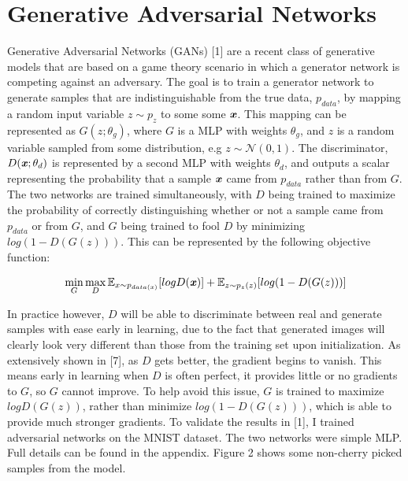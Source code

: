 \documentclass{article}
\begin{document}
\pagebreak

\section{Generative Adversarial Networks}
\noindent Generative Adversarial Networks (GANs) [1] are a recent class of generative models that are based on a game theory scenario in which a generator
network is competing against an adversary. The goal is to train a generator network to generate samples that are indistinguishable from the true data, $p_{data}$,
by mapping a random input variable $z \sim p_z$ to some some $\textbf{\textit{x}}$. This mapping can be represented as $G(z;\theta_g)$, where $G$ is a MLP with weights $\theta_g$, and $z$ is a random
variable sampled from some distribution, e.g $z \sim \mathcal{N}(0,1)$. The discriminator, $D(\textbf{\textit{x}}; \theta_d)$ is represented by a second MLP with weights
$\theta_d$, and outputs a scalar representing the probability that a sample $\textbf{\textit{x}}$ came from $p_{data}$ rather than from $G$. The two networks are trained
simultaneously, with $D$ being trained to maximize the probability of correctly distinguishing whether or not a sample came from $p_{data}$ or from $G$, and $G$ being 
trained to fool $D$ by minimizing $log(1-D(G(z)))$. This can be represented by the following objective function:

\[\min\limits_{G}\max\limits_{D} \mathbb{E}_{x \sim p_{data(x)}} [logD(\textbf{\textit{x}})] + \mathbb{E}_{z \sim p_z(z)}[log(1 - D(G(z)))]\]

\noindent In practice however, $D$ will be able to discriminate between real and generate samples with
ease early in learning, due to the fact that generated images will clearly look very different than those from the training set upon initialization. As extensively shown in [7],
as $D$ gets better, the gradient begins to vanish. This means early in learning when $D$ is often perfect, it provides little or no gradients to $G$, so $G$ cannot improve.
To help avoid this issue, $G$ is trained to maximize $logD(G(z))$, rather than minimize $log(1-D(G(z)))$, which is able to provide much stronger gradients. To validate the
results in [1], I trained adversarial networks on the MNIST dataset. The two networks were simple MLP. Full details can be found in the appendix. Figure 2 shows some non-cherry
picked samples from the model. \newline
\end{document}
